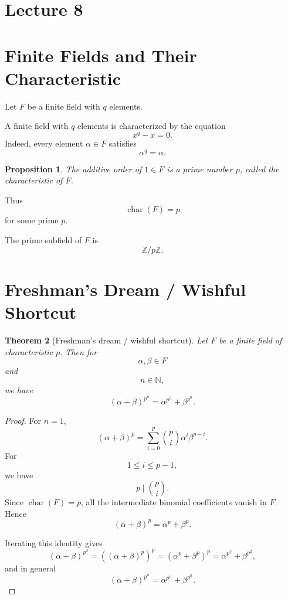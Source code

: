 \documentclass[11pt]{article}
\newtheorem{theorem}{Theorem}[section]
\newtheorem{proposition}[theorem]{Proposition}
\theoremstyle{remark}
\DeclareMathOperator{\charp}{char}
\newcommand{\Z}{\mathbb Z}
\newcommand{\N}{\mathbb N}
\begin{document}
\clearpage

\section*{Lecture 8}

\section{Finite Fields and Their Characteristic}

Let $F$ be a finite field with $q$ elements.

A finite field with $q$ elements is characterized by the equation
\[
    \boxed{x^q-x=0.}
\]
Indeed, every element $\alpha\in F$ satisfies
\[
    \alpha^q=\alpha.
\]

\begin{proposition}
The additive order of $1\in F$ is a prime number $p$, called the
characteristic of $F$.
\end{proposition}

Thus
\[
    \charp(F)=p
\]
for some prime $p$.

The prime subfield of $F$ is
\[
    \boxed{\Z/p\Z}.
\]

\section{Freshman's Dream / Wishful Shortcut}

\begin{theorem}[Freshman's dream / wishful shortcut]
Let $F$ be a finite field of characteristic $p$. Then for
\[
    \alpha,\beta\in F
\]
and
\[
    n\in\N,
\]
we have
\[
    \boxed{
    (\alpha+\beta)^{p^n}
    =
    \alpha^{p^n}+\beta^{p^n}.
    }
\]
\end{theorem}

\begin{proof}
For $n=1$,
\[
    (\alpha+\beta)^p
    =
    \sum_{i=0}^{p}
    \binom{p}{i}\alpha^i\beta^{p-i}.
\]
For
\[
    1\le i\le p-1,
\]
we have
\[
    p\mid\binom{p}{i}.
\]
Since $\charp(F)=p$, all the intermediate binomial coefficients vanish
in $F$. Hence
\[
    (\alpha+\beta)^p
    =
    \alpha^p+\beta^p.
\]

Iterating this identity gives
\[
    (\alpha+\beta)^{p^2}
    =
    \left((\alpha+\beta)^p\right)^p
    =
    (\alpha^p+\beta^p)^p
    =
    \alpha^{p^2}+\beta^{p^2},
\]
and in general
\[
    (\alpha+\beta)^{p^n}
    =
    \alpha^{p^n}+\beta^{p^n}.
\]
\end{proof}
\end{document}
